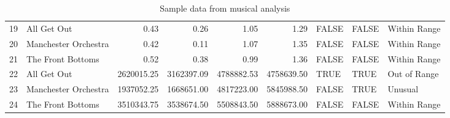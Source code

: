 \documentclass{article}\usepackage[]{graphicx}\usepackage[]{xcolor}
\begin{document}
\begin{table}[H]
\begin{tabular}{rlrrrrlll}
  19 & All Get Out & 0.43 & 0.26 & 1.05 & 1.29 & FALSE & FALSE & Within Range \\ 
  20 & Manchester Orchestra & 0.42 & 0.11 & 1.07 & 1.35 & FALSE & FALSE & Within Range \\ 
  21 & The Front Bottoms & 0.52 & 0.38 & 0.99 & 1.36 & FALSE & FALSE & Within Range \\ 
  22 & All Get Out & 2620015.25 & 3162397.09 & 4788882.53 & 4758639.50 & TRUE & TRUE & Out of Range \\ 
  23 & Manchester Orchestra & 1937052.25 & 1668651.00 & 4817223.00 & 5845988.50 & FALSE & TRUE & Unusual \\ 
  24 & The Front Bottoms & 3510343.75 & 3538674.50 & 5508843.50 & 5888673.00 & FALSE & FALSE & Within Range \\ 
   
   \hline
\end{tabular} \caption{Sample data from musical analysis} \label{table1}
\end{table}

\end{document}

